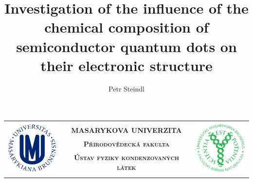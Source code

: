 \documentclass[
a4paper, %
11pt, %
onecolumn, %
openany, %
oldfontcommands,
]{memoir}
\author{Petr Steindl}
\title{Investigation of the influence of the chemical composition of semiconductor quantum dots on their electronic structure}
\begin{document}
\frontmatter
\pagestyle{empty} %
\savepagenumber %

%	
%
%	
	

\restorepagenumber %

\begingroup
\setlength{\tabcolsep}{3pt}
	\begin{center}
	\centering
	\begin{tabular}{rcl}
		\multirow{5}{*}{\includegraphics[height=2.8cm]{MUNI_logo.png}} & &
		\multirow{5}{*}{\includegraphics[height=2.8cm]{PrF_logo2.png}}\\[-0.19cm]
		& \lsstyle\bfseries\Large {MASARYKOVA UNIVERZITA}&\\[0.33cm]
		& \lsstyle\bfseries\Large\scshape {Přírodovědecká fakulta} & \\[0.25cm]
		\lsstyle\bfseries\scshape & \small\lsstyle\bfseries\scshape {Ústav fyziky kondenzovaných látek} & \lsstyle\bfseries\scshape \\ 
		& & \\ [-0.3cm] \cmidrule[2pt]{2-2}
	\end{tabular}
\end{center}
\endgroup
\end{document}
